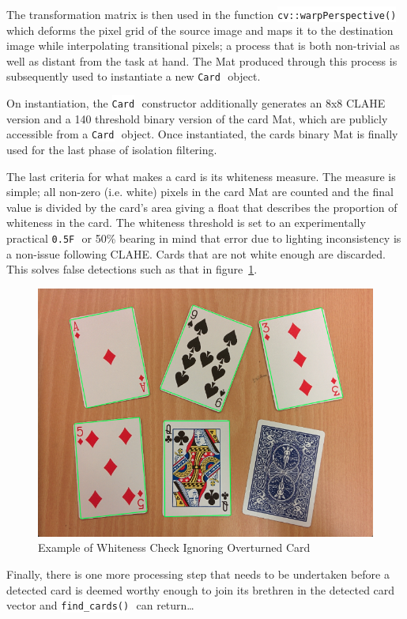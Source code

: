 \documentclass[a4paper,12pt,notitlepage]{article}
\newcommand{\code}[1]{\colorbox{white}{\lstinline[basicstyle=\ttfamily\color{black}]|#1|} }
\begin{document}
			The transformation matrix is then used in the function \code{cv::warpPerspective()} which deforms the pixel grid of the source image and maps it to the destination image while interpolating transitional pixels; a process that is both non-trivial as well as distant from the task at hand. The Mat produced through this process is subsequently used to instantiate a new \code{Card} object.

			On instantiation, the \code{Card} constructor additionally generates an 8x8 CLAHE version and a 140 threshold binary version of the card Mat, which are publicly accessible from a \code{Card} object. Once instantiated, the cards binary Mat is finally used for the last phase of isolation filtering.

			The last criteria for what makes a card is its whiteness measure. The measure is simple; all non-zero (i.e. white) pixels in the card Mat are counted and the final value is divided by the card's area giving a float that describes the proportion of whiteness in the card. The whiteness threshold is set to an experimentally practical \code{0.5F} or 50\% bearing in mind that error due to lighting inconsistency is a non-issue following CLAHE. Cards that are not white enough are discarded. This solves false detections such as that in figure~\ref{fig:whiteness}.

			\begin{figure}[H]
				\centering
				\includegraphics[width=0.9\linewidth]{whiteness}
				\caption{Example of Whiteness Check Ignoring Overturned Card}
				\label{fig:whiteness}
			\end{figure}

			Finally, there is one more processing step that needs to be undertaken before a detected card is deemed worthy enough to join its brethren in the detected card vector and \code{find_cards()} can return\ldots
\end{document}
